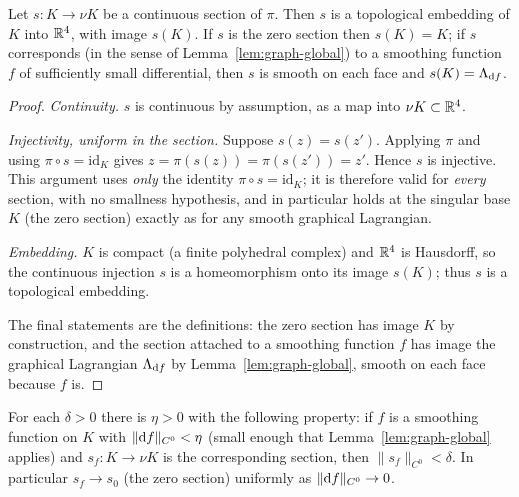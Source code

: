\begin{qeightlemma}\label{lem:section-embed}
Let $s\colon K\to\nu K$ be a continuous section of $\pi$. Then $s$ is a
topological embedding of $K$ into $\mathbb{R}^4$, with image $s(K)$. If $s$ is the
zero section then $s(K)=K$; if $s$ corresponds (in the sense of
Lemma~\ref{lem:graph-global}) to a smoothing function $f$ of sufficiently small
differential, then $s$ is smooth on each face and $s(K)=\Lambda_{\mathrm d f}$.
\end{qeightlemma}

\begin{proof}
\emph{Continuity.} $s$ is continuous by assumption, as a map into $\nu K\subset\mathbb{R}^4$.

\emph{Injectivity, uniform in the section.} Suppose $s(z)=s(z')$. Applying $\pi$
and using $\pi\circ s=\mathrm{id}_K$ gives $z=\pi(s(z))=\pi(s(z'))=z'$. Hence
$s$ is injective. This argument uses \emph{only} the identity $\pi\circ s=\mathrm{id}_K$;
it is therefore valid for \emph{every} section, with no smallness hypothesis, and
in particular holds at the singular base $K$ (the zero section) exactly as for any
smooth graphical Lagrangian.

\emph{Embedding.} $K$ is compact (a finite polyhedral complex) and $\mathbb{R}^4$ is
Hausdorff, so the continuous injection $s$ is a homeomorphism onto its image
$s(K)$; thus $s$ is a topological embedding.

The final statements are the definitions: the zero section has image $K$ by
construction, and the section attached to a smoothing function $f$ has image the
graphical Lagrangian $\Lambda_{\mathrm d f}$ by Lemma~\ref{lem:graph-global}, smooth on each
face because $f$ is.
\end{proof}

\begin{qeightlemma}\label{lem:section-small}
For each $\delta>0$ there is $\eta>0$ with the following property: if $f$ is a
smoothing function on $K$ with $\|\mathrm d f\|_{C^0}<\eta$ (small enough that
Lemma~\ref{lem:graph-global} applies) and $s_f\colon K\to\nu K$ is the
corresponding section, then $\|s_f\|_{C^0}<\delta$. In particular
$s_f\to s_0$ (the zero section) uniformly as $\|\mathrm d f\|_{C^0}\to0$.
\end{qeightlemma}

